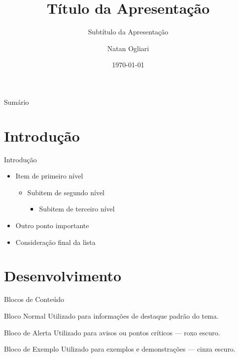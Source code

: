 \documentclass[paperwidth=33.87cm, paperheight=19.05cm, 11pt]{beamer}
\title{Título da Apresentação}
\subtitle{Subtítulo da Apresentação}
\author{Natan Ogliari}
\institute{Engenheiro de Software \\ Técnico em Eletroeletrônica}
\date{\today}
\begin{document}
\begin{frame}
  \titlepage
\end{frame}

\begin{frame}{Sumário}
  \tableofcontents
\end{frame}

\section{Introdução}

\begin{frame}{Introdução}
  \begin{itemize}
    \item Item de primeiro nível
    \begin{itemize}
      \item Subitem de segundo nível
      \begin{itemize}
        \item Subitem de terceiro nível
      \end{itemize}
    \end{itemize}
    \item Outro ponto importante
    \item Consideração final da lista
  \end{itemize}
\end{frame}

\section{Desenvolvimento}

\begin{frame}{Blocos de Conteúdo}
  \begin{block}{Bloco Normal}
    Utilizado para informações de destaque padrão do tema.
  \end{block}

  \vspace{0.3cm}

  \begin{alertblock}{Bloco de Alerta}
    Utilizado para avisos ou pontos críticos — roxo escuro.
  \end{alertblock}

  \vspace{0.3cm}

  \begin{exampleblock}{Bloco de Exemplo}
    Utilizado para exemplos e demonstrações — cinza escuro.
  \end{exampleblock}
\end{frame}
\end{document}
